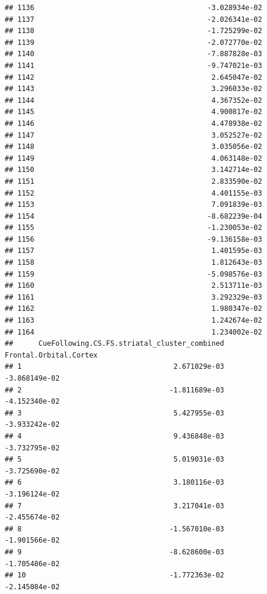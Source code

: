 \documentclass[
]{article}
\begin{document}
\begin{verbatim}
## 1136                                         -3.028934e-02
## 1137                                         -2.026341e-02
## 1138                                         -1.725299e-02
## 1139                                         -2.072770e-02
## 1140                                         -7.887828e-03
## 1141                                         -9.747021e-03
## 1142                                          2.645047e-02
## 1143                                          3.296033e-02
## 1144                                          4.367352e-02
## 1145                                          4.900817e-02
## 1146                                          4.478938e-02
## 1147                                          3.052527e-02
## 1148                                          3.035056e-02
## 1149                                          4.063148e-02
## 1150                                          3.142714e-02
## 1151                                          2.833590e-02
## 1152                                          4.401155e-03
## 1153                                          7.091839e-03
## 1154                                         -8.682239e-04
## 1155                                         -1.230053e-02
## 1156                                         -9.136158e-03
## 1157                                          1.401595e-03
## 1158                                          1.812643e-03
## 1159                                         -5.098576e-03
## 1160                                          2.513711e-03
## 1161                                          3.292329e-03
## 1162                                          1.980347e-02
## 1163                                          1.242674e-02
## 1164                                          1.234002e-02
##      CueFollowing.CS.FS.striatal_cluster_combined Frontal.Orbital.Cortex
## 1                                    2.671029e-03          -3.868149e-02
## 2                                   -1.811689e-03          -4.152340e-02
## 3                                    5.427955e-03          -3.933242e-02
## 4                                    9.436848e-03          -3.732795e-02
## 5                                    5.019031e-03          -3.725690e-02
## 6                                    3.180116e-03          -3.196124e-02
## 7                                    3.217041e-03          -2.455674e-02
## 8                                   -1.567010e-03          -1.901566e-02
## 9                                   -8.628600e-03          -1.705486e-02
## 10                                  -1.772363e-02          -2.145084e-02

\end{verbatim}
\end{document}
